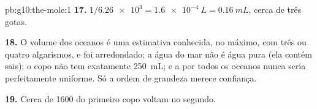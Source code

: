 \begin{solution}{pb:g10:the-mole:1}
\textbf{17.} $1 / \num{6.26e3} = \qty{1.6e-4}{L} = \qty{0.16}{mL}$,
cerca de três gotas.

\textbf{18.} O volume dos oceanos é uma estimativa conhecida, no máximo,
com três ou quatro algarismos, e foi arredondado; a água do mar não é
água pura (ela contém sais); o copo não tem exatamente \qty{250}{mL}; e
a  por todos os oceanos nunca seria perfeitamente uniforme. Só a
ordem de grandeza merece confiança.

\textbf{19.} Cerca de 1600  do primeiro copo voltam no segundo.
\end{solution}

